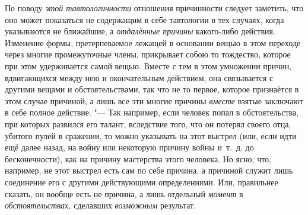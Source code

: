 По поводу {\em этой тавтологичности} отношения причинности следует заметить,
что оно может показаться не содержащим в себе тавтологии в тех случаях, когда
указываются не ближайшие, а {\em отдалённые причины} какого-либо действия.
Изменение формы, претерпеваемое лежащей в основании вещью в этом переходе через
многие промежуточные члены, прикрывает собою то тождество, которое при этом
удерживается самой вещью. Вместе с тем в этом умножении причин, вдвигающихся
между нею и окончательным действием, она связывается с другими вещами и
обстоятельствами, так что не то первое, которое признаётся в этом случае
причиной, а лишь все эти многие причины {\em вместе} взятые заключают в себе
полное действие. "--- Так например, если человек попал в обстоятельства, при
которых развился его талант, вследствие того, что он потерял своего отца,
убитого пулей в сражении, то можно указывать на этот выстрел (или, если идти
ещё далее назад, на войну или некоторую причину войны и~т.~д. до
бесконечности), как на причину мастерства этого человека. Но ясно, что,
например, не этот выстрел есть сам по себе причина, а причиной служит лишь
соединение его с другими действующими определениями. Или, правильнее сказать,
он вообще есть не причина, а лишь отдельный {\em момент} в~{\em
обстоятельствах,} сделавших {\em возможным} результат.

